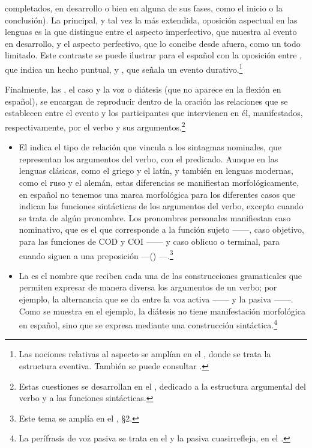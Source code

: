 \begin{itemize}
        completados, en desarrollo o bien en alguna de sus fases, como el inicio
        o la conclusión). La principal, y tal vez la más extendida, oposición
        aspectual en las lenguas es la que distingue entre el aspecto
        imperfectivo, que muestra al evento en desarrollo, y el aspecto
        perfectivo, que lo concibe desde afuera, como un todo limitado. Este
        contraste se puede ilustrar para el español con la oposición entre
        , que indica un hecho puntual, y , que
        señala un evento durativo.\footnote{Las nociones relativas al aspecto se
        amplían en el , donde se trata la estructura eventiva. También
        se puede consultar \textcite{debin2018}.}
\end{itemize}

Finalmente, las , el caso y la voz o
diátesis (que no aparece en la flexión en español), se encargan de reproducir
dentro de la oración las relaciones que se establecen entre el evento y los
participantes que intervienen en él, manifestados, respectivamente, por el verbo
y sus argumentos.\footnote{Estas cuestiones se desarrollan en el ,
dedicado a la estructura argumental del verbo y a las funciones sintácticas.}

\begin{itemize}
  \item El  indica el tipo de relación que vincula a los sintagmas
        nominales, que representan los argumentos del verbo, con el predicado.
        Aunque en las lenguas clásicas, como el griego y el latín, y también en
        lenguas modernas, como el ruso y el alemán, estas diferencias se
        manifiestan morfológicamente, en español no tenemos una marca
        morfológica para los diferentes casos que indican las funciones
        sintácticas de los argumentos del verbo, excepto cuando se trata de
        algún pronombre. Los pronombres personales manifiestan caso nominativo,
        que es el que corresponde a la función sujeto ------, caso
        objetivo, para las funciones de COD y COI ------ y caso oblicuo
        o terminal, para cuando siguen a una preposición ---()
        ---.\footnote{Este tema se amplía en el , §2.}
  \item La  es el nombre que reciben cada una de las
        construcciones gramaticales que permiten expresar de manera diversa los
        argumentos de un verbo; por ejemplo, la alternancia que se da entre la
        voz activa ------ y la pasiva ------. Como se muestra en el ejemplo, la diátesis no tiene
        manifestación morfológica en español, sino que se expresa mediante una
        construcción sintáctica.\footnote{La perífrasis de voz pasiva se trata
        en el  y la pasiva cuasirrefleja, en el .}
\end{itemize}

